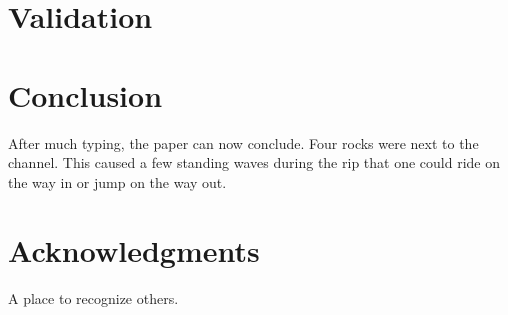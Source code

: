 \documentclass[]{aiaa-tc}%
\begin{document}
\section{Validation}

\section{Conclusion}

After much typing, the paper can now conclude.
Four rocks were next to the channel.
This caused a few standing waves during the rip that one could ride on
the way in or jump on the way out.

\section*{Acknowledgments}

A place to recognize others.
\end{document}
